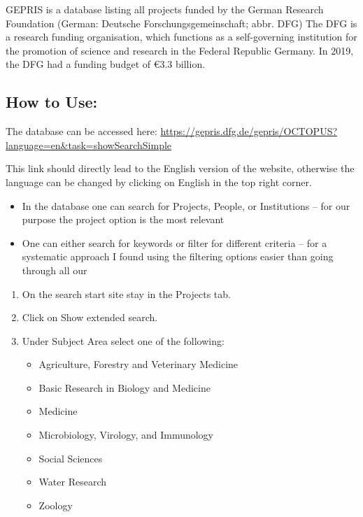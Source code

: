 \documentclass[
]{book}
\begin{document}
GEPRIS is a database listing all projects funded by the German Research Foundation (German: Deutsche Forschungsgemeinschaft; abbr. DFG) The DFG is a research funding organisation, which functions as a self-governing institution for the promotion of science and research in the Federal Republic Germany. In 2019, the DFG had a funding budget of €3.3 billion.

\hypertarget{how-to-use}{%
\subsection{How to Use:}\label{how-to-use}}

The database can be accessed here: \url{https://gepris.dfg.de/gepris/OCTOPUS?language=en\&task=showSearchSimple}

This link should directly lead to the English version of the website, otherwise the language can be changed by clicking on English in the top right corner.

\begin{itemize}
\item
  In the database one can search for Projects, People, or Institutions -- for our purpose the project option is the most relevant
\item
  One can either search for keywords or filter for different criteria -- for a systematic approach I found using the filtering options easier than going through all our
\end{itemize}

\begin{enumerate}
\def\labelenumi{\arabic{enumi}.}
\item
  On the search start site stay in the Projects tab.
\item
  Click on Show extended search.
\item
  Under Subject Area select one of the following:

  \begin{itemize}
  \item
    Agriculture, Forestry and Veterinary Medicine
  \item
    Basic Research in Biology and Medicine
  \item
    Medicine
  \item
    Microbiology, Virology, and Immunology
  \item
    Social Sciences
  \item
    Water Research
  \item
    Zoology
  \end{itemize}
\end{enumerate}
\end{document}
